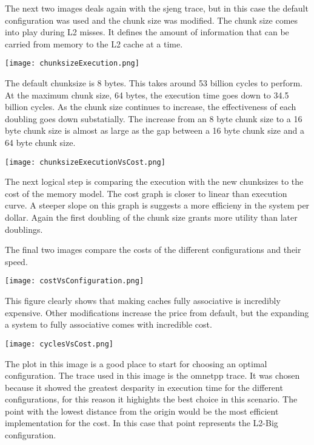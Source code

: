 \documentclass[cacheSimReport.tex]{subfiles}
\begin{document}
\smallskip

The next two images deals again with the sjeng trace, but in this case the default configuration was used and the chunk size was modified. The chunk size comes into play during L2 misses. It defines the amount of information that can be carried from memory to the L2 cache at a time.

\hspace{-.9cm}\texttt{[image: chunksizeExecution.png]}

The default chunksize is 8 bytes. This takes around 53 billion cycles to perform. At the maximum chunk size, 64 bytes, the execution time goes down to 34.5 billion cycles. As the chunk size continues to increase, the effectiveness of each doubling goes down substatially. The increase from an 8 byte chunk size to a 16 byte chunk size is almost as large as the gap between a 16 byte chunk size and a 64 byte chunk size.

\hspace{-.9cm}\texttt{[image: chunksizeExecutionVsCost.png]}

The next logical step is comparing the execution with the new chunksizes to the cost of the memory model. The cost graph is closer to linear than execution curve. A steeper slope on this graph is suggests a more efficieny in the system per dollar. Again the first doubling of the chunk size grants more utility than later doublings.

\smallskip

The final two images compare the costs of the different configurations and their speed. 

\hspace{-.9cm}\texttt{[image: costVsConfiguration.png]}

This figure clearly shows that making caches fully associative is incredibly expensive. Other modifications increase the price from default, but the expanding a system to fully associative comes with incredible cost.

\hspace{.9cm}\texttt{[image: cyclesVsCost.png]}

The plot in this image is a good place to start for choosing an optimal configuration. The trace used in this image is the omnetpp trace. It was chosen because it showed the greatest desparity in execution time for the different configurations, for this reason it highights the best choice in this scenario. The point with the lowest distance from the origin would be the most efficient implementation for the cost. In this case that point represents the L2-Big configuration.
\end{document}
